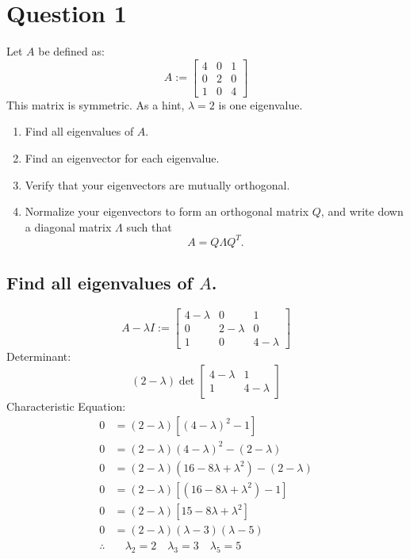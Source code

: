 

\maketitle
\section{Question 1}
Let $A$ be defined as:
\[
	A :=
	\begin{bmatrix}
		4 & 0 & 1 \\
		0 & 2 & 0 \\
		1 & 0 & 4
	\end{bmatrix}
\]
This matrix is symmetric. As a hint, $\lambda=2$ is one eigenvalue.
\begin{enumerate}
	\item[(a)] Find all eigenvalues of $A$.
	\item[(b)] Find an eigenvector for each eigenvalue.
	\item[(c)] Verify that your eigenvectors are mutually orthogonal.
	\item[(d)] Normalize your eigenvectors to form an orthogonal matrix $Q$, and write down a diagonal matrix $\Lambda$ such that \[ A = Q\Lambda Q^T. \]
\end{enumerate}
\subsection{Find all eigenvalues of $A$.}
\[
	A-\lambda I :=
	\begin{bmatrix}
		4-\lambda & 0         & 1         \\
		0         & 2-\lambda & 0         \\
		1         & 0         & 4-\lambda
	\end{bmatrix}
\]
Determinant:
\[
	(2-\lambda) \det \begin{bmatrix}
		4-\lambda & 1         \\
		1         & 4-\lambda
	\end{bmatrix}
\]
Characteristic Equation:
\[
	\begin{aligned}
		0          & = (2-\lambda) \left[ (4-\lambda)^2 - 1 \right]              \\
		0          & = (2-\lambda)(4-\lambda)^2 - (2-\lambda)                    \\
		0          & = (2-\lambda)(16 -8\lambda + \lambda^2) - (2-\lambda)       \\
		0          & = (2-\lambda)[(16 -8\lambda + \lambda^2) - 1]               \\
		0          & = (2-\lambda)[15 -8\lambda + \lambda^2 ]                    \\
		0          & = (2-\lambda)(\lambda-3)(\lambda-5)                         \\
		\therefore & \quad \lambda_2 = 2 \quad \lambda_3 = 3 \quad \lambda_5 = 5
	\end{aligned}
\]
